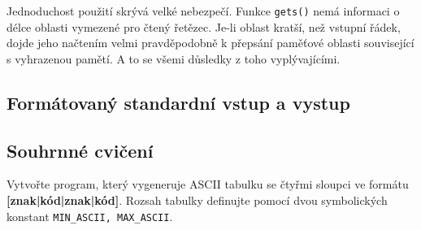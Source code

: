       Jednoduchost použití skrývá velké nebezpečí. Funkce \texttt{gets()} nemá informaci o délce 
      oblasti vymezené pro čtený řetězec. Je-li oblast kratší, než vstupní řádek, dojde jeho 
      načtením velmi pravděpodobně k přepsání paměťové oblasti související s vyhrazenou pamětí. A 
      to se všemi důsledky z toho vyplývajícími.
  
    \subsection{Formátovaný standardní vstup a vystup}
    \subsection{Souhrnné cvičení}
      \begin{example}Vytvořte program, který vygeneruje ASCII tabulku se čtyřmi sloupci ve formátu 
      \textbf{[znak|kód|znak|kód]}. Rozsah tabulky definujte pomocí dvou symbolických konstant 
      \lstinline[basicstyle=\ttfamily]!MIN_ASCII, MAX_ASCII!. 
  
        
      \end{example} 

\printbibliography[title={Seznam literatury}, heading=subbibliography]
